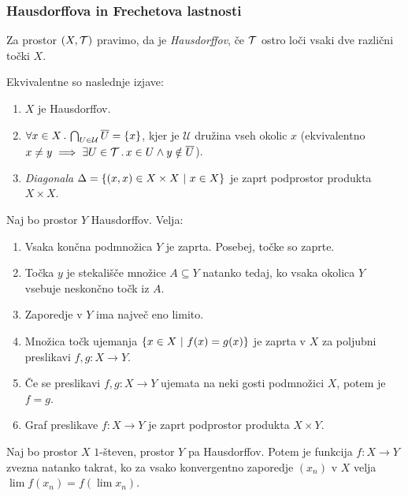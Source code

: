 \subsubsection{Hausdorffova in Frechetova lastnosti}
\begin{definicija}
    Za prostor $(X, \mathcal{T})$ pravimo, da je \emph{Hausdorffov}, če $\mathcal{T}$ ostro loči vsaki dve različni točki $X$.
\end{definicija}

\begin{trditev}
    Ekvivalentne so naslednje izjave:
    \begin{enumerate}
        \item $X$ je Hausdorffov.
        \item $\forall x \in X \,.\, \bigcap_{U \in \mathcal{U}} \overline{U} = \left\{x\right\}$, kjer je $\mathcal{U}$ družina vseh okolic $x$ (ekvivalentno $x \neq y \implies \exists U \in \mathcal{T} \,.\, x \in U \land y \notin \overline{U}$).
        \item \emph{Diagonala} $\Delta = \left\{(x,x) \in X \times X \ | \ x \in X\right\}$ je zaprt podprostor produkta $X \times X$.
    \end{enumerate}
\end{trditev}

\begin{izrek}
    Naj bo prostor $Y$ Hausdorffov. Velja:
    \begin{enumerate}
        \item Vsaka končna podmnožica $Y$ je zaprta. Posebej, točke so zaprte.
        \item Točka $y$ je stekališče množice $A \subseteq Y$ natanko tedaj, ko vsaka okolica $Y$ vsebuje neskončno točk iz $A$.
        \item Zaporedje v $Y$ ima največ eno limito.
        \item Množica točk ujemanja $\left\{x \in X \ | \ f(x) = g(x)\right\}$ je zaprta v $X$ za poljubni preslikavi $f, g: X \to Y$.
        \item Če se preslikavi $f, g: X \to Y$ ujemata na neki gosti podmnožici $X$, potem je $f = g$.
        \item Graf preslikave $f: X \to Y$ je zaprt podprostor produkta $X \times Y$.
    \end{enumerate}
\end{izrek}

\begin{izrek}
    Naj bo prostor $X$ $1$-števen, prostor $Y$ pa Hausdorffov. Potem je funkcija $f: X \to Y$ zvezna natanko takrat, ko za vsako konvergentno zaporedje $(x_n)$ v $X$ velja $\lim f(x_n) = f(\lim x_n)$.
\end{izrek}

